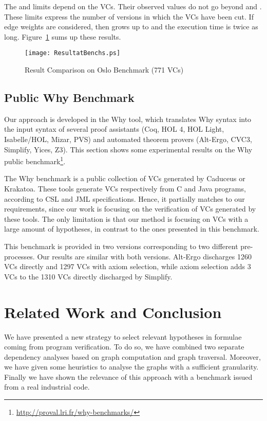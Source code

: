\documentclass{acm_proc_article-sp}
\theoremstyle{nonumberplain}
\begin{document}
The  and  limits depend on the VCs.
Their observed values do not go beyond  and
. These limits express the number of versions in
which the VCs have been cut. If edge weights are considered, then
 grows up to  and the execution time
is twice as long.
Figure~\ref{fig:ComparisonDiagramme} sums up these results.


\begin{figure}[ht]
  \begin{center}
    \texttt{[image: ResultatBenchs.ps]}\\   
  \end{center}
  \caption{Result Comparison on Oslo Benchmark (771 VCs)}
  \label{fig:ComparisonDiagramme}
\end{figure}




\subsection{Public Why Benchmark}\label{sub:exp:whybenchs}
Our approach is developed in the Why tool, which translates Why syntax
into the input syntax of several proof assistants (Coq, HOL 4, HOL
Light, Isabelle/HOL, Mizar, PVS) and automated theorem provers
(Alt-Ergo, CVC3, Simplify, Yices, Z3). This section shows some
experimental results on the Why public
benchmark\footnote{\url{http://proval.lri.fr/why-benchmarks/}}.


The Why benchmark is a public collection of VCs generated by Caduceus
or Krakatoa. These tools generate VCs respectively from C and Java
programs, according to CSL and JML specifications. Hence, it partially
matches to our requirements, since our work is focusing on the
verification of VCs generated by these tools. The only limitation is
that our method is focusing on VCs with a large amount of hypotheses,
in contrast to the ones presented in this benchmark.


This benchmark is provided in two versions corresponding to two
different pre-processes. Our results are similar with both versions.
Alt-Ergo discharges 1260 VCs directly and 1297 VCs with axiom
selection, while axiom selection adds 3 VCs to the 1310 VCs 
directly discharged by Simplify.


\section{Related Work and Conclusion}\label{relatedandconcl}
We have presented a new strategy 
to select relevant hypotheses in formulae coming from program 
verification. To do so, we have combined two separate dependency 
analyses based on graph computation and graph traversal. Moreover, we 
have given some heuristics to analyse the graphs with a sufficient 
granularity. Finally we have shown the relevance of this approach 
with a benchmark issued from a real industrial code.
\end{document}
